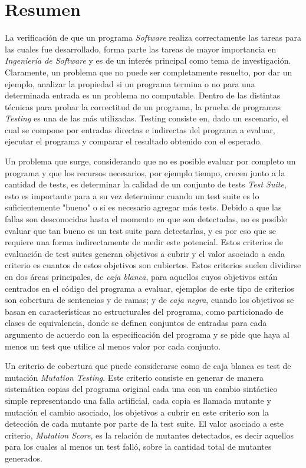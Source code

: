 \chapter*{Resumen}
La verificaci\'on de que un programa \emph{Software} realiza correctamente las tareas para las cuales fue desarrollado, forma parte las tareas de mayor importancia en \emph{Ingenier\'ia de Software} y es de un inter\'es principal como tema de investigaci\'on. Claramente, un problema que no puede ser completamente resuelto, por dar un ejemplo, analizar la propiedad si un programa termina o no para una determinada entrada es un problema no computable. Dentro de las distintas t\'ecnicas para probar la correctitud de un programa, la prueba de programas \emph{Testing} es una de las m\'as utilizadas. Testing consiste en, dado un escenario, el cual se compone por entradas directas e indirectas del programa a evaluar, ejecutar el programa y comparar el resultado obtenido con el esperado.

Un problema que surge, considerando que no es posible evaluar por completo un programa y que los recursos necesarios, por ejemplo tiempo, crecen junto a la cantidad de tests, es determinar la calidad de un conjunto de tests \emph{Test Suite}, esto es importante para a su vez determinar cuando un test suite es lo suficientemente "bueno" o si es necesario agregar m\'as tests. Debido a que las fallas son desconocidas hasta el momento en que son detectadas, no es posible evaluar que tan bueno es un test suite para detectarlas, y es por eso que se requiere una forma indirectamente de medir este potencial. Estos criterios de evaluaci\'on de test suites generan objetivos a cubrir y el valor asociado a cada criterio es cuantos de estos objetivos son cubiertos. Estos criterios suelen dividirse en dos \'areas principales, de \emph{caja blanca}, para aquellos cuyos objetivos est\'an centrados en el c\'odigo del programa a evaluar, ejemplos de este tipo de criterios son cobertura de sentencias y de ramas; y de \emph{caja negra}, cuando los objetivos se basan en caracter\'isticas no estructurales del programa, como particionado de clases de equivalencia, donde se definen conjuntos de entradas para cada argumento de acuerdo con la especificaci\'on del programa y se pide que haya al menos un test que utilice al menos valor por cada conjunto.

Un criterio de cobertura que puede considerarse como de caja blanca es test de mutaci\'on \emph{Mutation Testing}. Este criterio consiste en generar de manera sistem\'atica copias del programa original cada una con un cambio sint\'actico simple representando una falla artificial, cada copia es llamada mutante y mutaci\'on el cambio asociado, los objetivos a cubrir en este criterio son la detecci\'on de cada mutante por parte de la test suite. El valor asociado a este criterio, \emph{Mutation Score}, es la relaci\'on de mutantes detectados, es decir aquellos para los cuales al menos un test fall\'o, sobre la cantidad total de mutantes generados.


